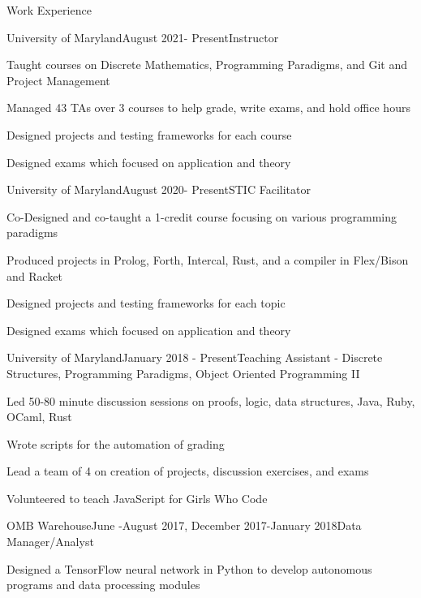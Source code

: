 \documentclass{resume} %
\begin{document}
\begin{rSection}{Work Experience}

\begin{rSubsection}{University of Maryland}{August 2021- Present}{Instructor }{}
\item Taught courses on Discrete Mathematics, Programming Paradigms, and Git and Project Management
\item Managed 43 TAs over 3 courses to help grade, write exams, and hold office hours
\item Designed projects and testing frameworks for each course 
\item Designed exams which focused on application and theory
\end{rSubsection}

\begin{rSubsection}{University of Maryland}{August 2020- Present}{STIC Facilitator}{}
\item Co-Designed and co-taught a 1-credit course focusing on various programming paradigms
\item Produced projects in Prolog, Forth, Intercal, Rust, and a compiler in Flex/Bison and Racket
\item Designed projects and testing frameworks for each topic
\item Designed exams which focused on application and theory
\end{rSubsection}

\begin{rSubsection}{University of Maryland}{January 2018 - Present}{Teaching Assistant - Discrete Structures, Programming Paradigms, Object Oriented Programming II}{}
\item Led 50-80 minute discussion sessions on proofs, logic, data structures, Java, Ruby, OCaml, Rust
\item Wrote scripts for the automation of grading
\item Lead a team of 4 on creation of projects, discussion exercises, and exams 
\item Volunteered to teach JavaScript for Girls Who Code
\end{rSubsection}


\begin{rSubsection}{OMB Warehouse}{June -August 2017, December 2017-January 2018}{Data Manager/Analyst}{}
\item Designed a TensorFlow neural network in Python to develop autonomous programs and data processing modules
\end{rSubsection}

\end{rSection}
\end{document}
